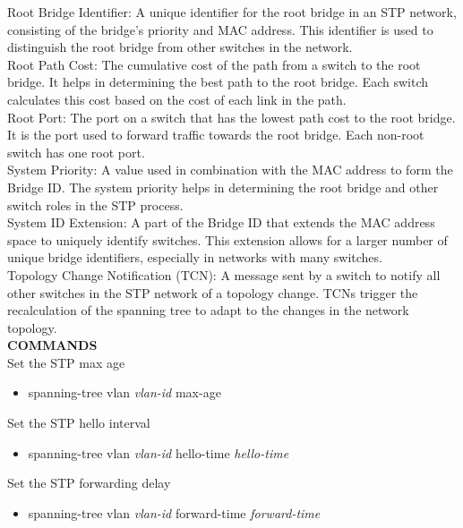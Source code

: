 \documentclass{article}
\begin{document}
Root Bridge Identifier: A unique identifier for the root bridge in an STP network, consisting of the bridge’s priority and MAC address. This identifier is used to distinguish the root bridge from other switches in the network.\\

Root Path Cost: The cumulative cost of the path from a switch to the root bridge. It helps in determining the best path to the root bridge. Each switch calculates this cost based on the cost of each link in the path.\\

Root Port: The port on a switch that has the lowest path cost to the root bridge. It is the port used to forward traffic towards the root bridge. Each non-root switch has one root port.\\

System Priority: A value used in combination with the MAC address to form the Bridge ID. The system priority helps in determining the root bridge and other switch roles in the STP process.\\

System ID Extension: A part of the Bridge ID that extends the MAC address space to uniquely identify switches. This extension allows for a larger number of unique bridge identifiers, especially in networks with many switches.\\

Topology Change Notification (TCN): A message sent by a switch to notify all other switches in the STP network of a topology change. TCNs trigger the recalculation of the spanning tree to adapt to the changes in the network topology.\\

\noindent\textbf{COMMANDS}\\
Set the STP max age
\begin{itemize}
\item spanning-tree vlan \textit{vlan-id} max-age
\end{itemize}

Set the STP hello interval
\begin{itemize}
\item spanning-tree vlan \textit{vlan-id} hello-time \textit{hello-time}
\end{itemize}

Set the STP forwarding delay
\begin{itemize}
\item spanning-tree vlan \textit{vlan-id} forward-time \textit{forward-time}
\end{itemize}
\end{document}
